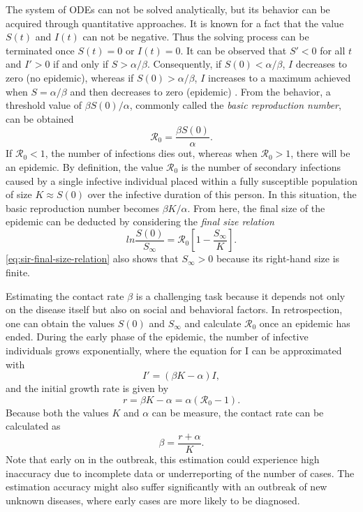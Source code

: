 The system of \glspl{ODE} can not be solved analytically, but its behavior can be acquired through quantitative approaches.
It is known for a fact that the value $S(t)$ and $I(t)$ can not be negative.
Thus the solving process can be terminated once $S(t) = 0$ or $I(t) = 0$.
It can be observed that $S' < 0$ for all $t$ and $I' > 0$ if and only if $S > \alpha / \beta$.
Consequently, if $S(0) < \alpha / \beta$, $I$ decreases to zero (no epidemic), whereas if $S(0) > \alpha / \beta$, $I$ increases to a maximum achieved when $S = \alpha / \beta$ and then decreases to zero (epidemic) \cite{brauerCompartmentalModelsEpidemiology2008}.
From the behavior, a threshold value of $\beta S(0) / \alpha$, commonly called the \textit{basic reproduction number}, can be obtained
\begin{equation*}
    \mathcal{R}_0 = \frac{\beta S(0)}{\alpha}.
\end{equation*}
If $\mathcal{R}_0 < 1$, the number of infections dies out, whereas when $\mathcal{R}_0 > 1$, there will be an epidemic.
By definition, the value $\mathcal{R}_0$ is the number of secondary infections caused by a single infective individual placed within a fully susceptible population of size $K \approx S(0)$ over the infective duration of this person.
In this situation, the basic reproduction number becomes $\beta K / \alpha$.
From here, the final size of the epidemic can be deducted by considering the \textit{final size relation} \cite{brauerCompartmentalModelsEpidemiology2008}
\begin{equation}
    ln \frac{S(0)}{S_\infty} = \mathcal{R}_0 \left[ 1 - \frac{S_\infty}{K} \right].
    \label{eq:sir-final-size-relation}
\end{equation}
\autoref{eq:sir-final-size-relation} also shows that $S_\infty > 0$ because its right-hand size is finite.

Estimating the contact rate $\beta$ is a challenging task because it depends not only on the disease itself but also on social and behavioral factors.
In retrospection, one can obtain the values $S(0)$ and $S_\infty$ and calculate $\mathcal{R}_0$ once an epidemic has ended.
During the early phase of the epidemic, the number of infective individuals grows exponentially, where the equation for I can be approximated with \cite{brauerCompartmentalModelsEpidemiology2008}
\begin{equation*}
    I' = (\beta K - \alpha) I,
\end{equation*}
and the initial growth rate is given by
\begin{equation*}
    r = \beta K - \alpha = \alpha (\mathcal{R}_0 - 1).
\end{equation*}
Because both the values $K$ and $\alpha$ can be measure, the contact rate can be calculated as \cite{brauerCompartmentalModelsEpidemiology2008}
\begin{equation*}
    \beta = \frac{r + \alpha}{K}.
\end{equation*}
Note that early on in the outbreak, this estimation could experience high inaccuracy due to incomplete data or underreporting of the number of cases.
The estimation accuracy might also suffer significantly with an outbreak of new unknown diseases, where early cases are more likely to be diagnosed.

